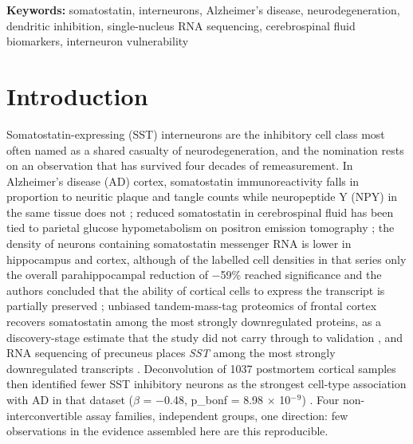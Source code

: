 \documentclass[11pt]{article}
\begin{document}
\noindent\textbf{Keywords:} somatostatin, interneurons, Alzheimer's disease, neurodegeneration, dendritic inhibition, single-nucleus RNA sequencing, cerebrospinal fluid biomarkers, interneuron vulnerability

\clearpage

\section{Introduction}
\label{sec-introduction}

Somatostatin-expressing (SST) interneurons are the inhibitory cell class most often named as a shared casualty of neurodegeneration, and the nomination rests on an observation that has survived four decades of remeasurement. In Alzheimer's disease (AD) cortex, somatostatin immunoreactivity falls in proportion to neuritic plaque and tangle counts while neuropeptide Y (NPY) in the same tissue does not \citep{Dawbarn1986}; reduced somatostatin in cerebrospinal fluid has been tied to parietal glucose hypometabolism on positron emission tomography \citep{Tamminga1987}; the density of neurons containing somatostatin messenger RNA is lower in hippocampus and cortex, although of the labelled cell densities in that series only the overall parahippocampal reduction of $-$59\% reached significance and the authors concluded that the ability of cortical cells to express the transcript is partially preserved \citep{Dournaud1994}; unbiased tandem-mass-tag proteomics of frontal cortex recovers somatostatin among the most strongly downregulated proteins, as a discovery-stage estimate that the study did not carry through to validation \citep{Sathe2020}, and RNA sequencing of precuneus places \emph{SST} among the most strongly downregulated transcripts \citep{Guennewig2021}. Deconvolution of 1037 postmortem cortical samples then identified fewer SST inhibitory neurons as the strongest cell-type association with AD in that dataset ($\beta$ = $-$0.48, p\_bonf = 8.98 $\times$ 10$^{-}$$^{9}$) \citep{Consens2022b}. Four non-interconvertible assay families, independent groups, one direction: few observations in the evidence assembled here are this reproducible.
\end{document}
